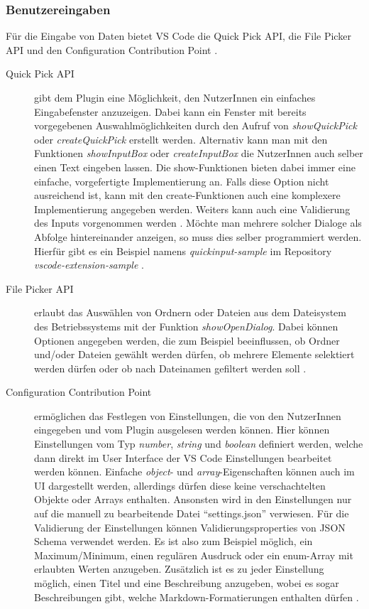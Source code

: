 \subsubsection{Benutzereingaben}
\label{sec:FunktionalitätDerPluginAPI_Benutzereingaben}
  Für die Eingabe von Daten bietet VS Code die Quick Pick API, die File Picker API
  und den Configuration Contribution Point \cite{VSCodeExtensionAPICommonCapabilities}.
  \begin{description}
    \item[Quick Pick API] gibt dem Plugin eine Möglichkeit, den NutzerInnen ein einfaches Eingabefenster
      anzuzeigen. Dabei kann ein Fenster mit bereits vorgegebenen Auswahlmöglichkeiten durch
      den Aufruf von \emph{showQuickPick} oder \emph{createQuickPick} erstellt werden.
      Alternativ kann man mit den Funktionen \emph{showInputBox} oder \emph{createInputBox}
      die NutzerInnen auch selber einen Text eingeben lassen. Die show-Funktionen bieten dabei immer
      eine einfache, vorgefertigte Implementierung an. Falls diese Option nicht ausreichend ist,
      kann mit den create-Funktionen auch eine komplexere Implementierung angegeben werden.
      Weiters kann auch eine Validierung des Inputs vorgenommen werden \cite{VSCodeExtensionAPIQuickPick}.
      Möchte man mehrere solcher Dialoge als Abfolge hintereinander anzeigen, so muss dies
      selber programmiert werden. Hierfür gibt es ein Beispiel namens \emph{quickinput-sample}
      \cite{VSCodeExtensionAPIQuickInputSample}
      im Repository \emph{vscode-extension-sample} \cite{VSCodeExtensionSamples}. 
    \item[File Picker API] erlaubt das Auswählen von Ordnern oder Dateien aus dem Dateisystem
      des Betriebssystems mit der Funktion \emph{showOpenDialog}. Dabei können Optionen angegeben
      werden, die zum Beispiel beeinflussen, ob Ordner und/oder Dateien gewählt werden dürfen, 
      ob mehrere Elemente selektiert werden dürfen oder ob nach Dateinamen gefiltert werden soll
      \cite{VSCodeExtensionAPIFilePicker}.
    \item[Configuration Contribution Point] ermöglichen das Festlegen von Einstellungen,
      die von den NutzerInnen eingegeben und vom Plugin ausgelesen werden können. Hier können
      Einstellungen vom Typ \emph{number}, \emph{string} und \emph{boolean} definiert werden, welche dann direkt
      im User Interface der VS Code Einstellungen bearbeitet werden können.
      Einfache \emph{object}- und \emph{array}-Eigenschaften können auch im UI dargestellt werden,
      allerdings dürfen diese keine verschachtelten Objekte oder Arrays enthalten.
      Ansonsten wird in den Einstellungen nur auf die manuell zu bearbeitende
      Datei \enquote{settings.json} verwiesen.
      Für die Validierung der Einstellungen können Validierungsproperties
      von JSON Schema verwendet werden. Es ist also zum Beispiel möglich,
      ein Maximum/Minimum, einen regulären Ausdruck oder ein enum-Array
      mit erlaubten Werten anzugeben.
      Zusätzlich ist es zu jeder Einstellung möglich, einen Titel und eine Beschreibung
      anzugeben, wobei es sogar Beschreibungen gibt, welche Markdown-Formatierungen
      enthalten dürfen \cite{VSCodeExtensionAPIContributionPointsConfiguration}.
  \end{description}
